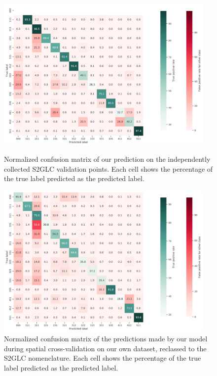         \begin{figure}[!hbt]
            \centering
            \includegraphics[width=0.95\textwidth]{figs_03/results_confusion_matrix_s2glc_conservative_predicted_rate.png}
            \caption{Normalized confusion matrix of our prediction on the independently collected S2GLC validation points. Each cell shows the percentage of the true label predicted as the predicted label.}
            \label{fig:confusion_matrix_s2glc_independent}
            \includegraphics[width=0.95\textwidth]{figs_03/results_confusion_matrix_s2glc-CV_conservative_predicted_rate.png}
            \caption{Normalized confusion matrix of the predictions made by our model during spatial cross-validation on our own dataset, reclassed to the S2GLC nomenclature. Each cell shows the percentage of the true label predicted as the predicted label.}
            \label{fig:confusion_matrix_s2glc_crossvalidated}
        \end{figure}
        
